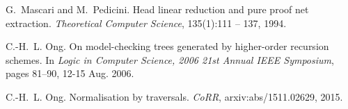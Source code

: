 \documentclass[xchauthor,chkrefs,GCNS,amsmath,amsthm,rotating,leaveRGB]{tcsg}
\theoremstyle{plain}
\theoremstyle{definition}
\begin{document}
\begin{backmatter}
\begin{thebibliography}{}
\begin{bsubitem}
\begin{bcontribution}%
\end{bcontribution}
\begin{bhost}
\begin{bissue}
\end{bissue}
\end{bhost}
\end{bsubitem}
%
\OrigBibText
G.~Mascari and M.~Pedicini.
 Head linear reduction and pure proof net extraction.
 \emph{Theoretical Computer Science}, 135(1):111 -- 137, 1994.
\endOrigBibText
{}%
\endbibitem

\begin{bsubitem}
\begin{bcontribution}%
\end{bcontribution}
\begin{bhost}
\begin{beditedbook}
\end{beditedbook}
\end{bhost}
\end{bsubitem}
%
\OrigBibText
C.-H.~L. Ong.
 On model-checking trees generated by higher-order recursion schemes.
 In \emph{Logic in Computer Science, 2006 21st Annual IEEE Symposium},
 pages 81--90, 12-15 Aug. 2006.
\endOrigBibText
{}%
\endbibitem

\begin{bsubitem}
\begin{bcontribution}%
\end{bcontribution}
\prnsep{,\ }
\begin{bhost}
\begin{behost}
\end{behost}
\end{bhost}
\end{bsubitem}
%
\OrigBibText
C.-H.~L. Ong.
 Normalisation by traversals.
 \emph{CoRR}, arxiv:abs/1511.02629, 2015.
\endOrigBibText
{}%
\endbibitem


\end{thebibliography}
\end{backmatter}
\end{document}
